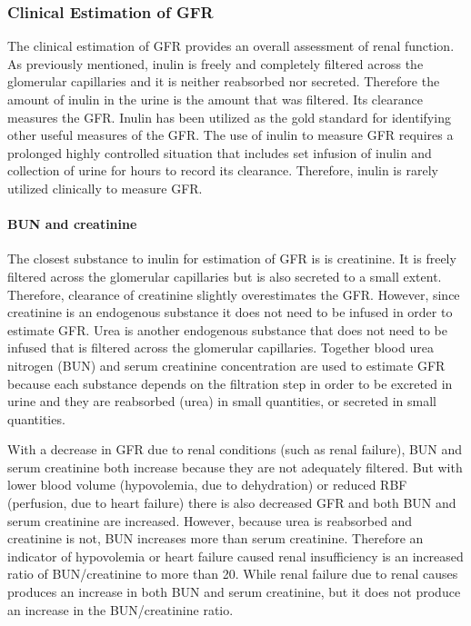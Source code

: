\subsubsection{Clinical Estimation of GFR}

The clinical estimation of GFR provides an overall assessment of renal function. As previously mentioned, inulin is freely and completely filtered across the glomerular capillaries and it is neither reabsorbed nor secreted. Therefore the amount of inulin in the urine is the amount that was filtered. Its clearance measures the GFR. Inulin has been utilized as the gold standard for identifying other useful measures of the GFR. The use of inulin to measure GFR requires a prolonged highly controlled situation that includes set infusion of inulin and collection of urine for hours to record its clearance. Therefore, inulin is rarely utilized clinically to measure GFR.

\paragraph{BUN and creatinine}

The closest substance to inulin for estimation of GFR is is creatinine. It is freely filtered across the glomerular capillaries but is also secreted to a small extent. Therefore, clearance of creatinine slightly overestimates the GFR. However, since creatinine is an endogenous substance it does not need to be infused in order to estimate GFR. Urea is another endogenous substance that does not need to be infused that is filtered across the glomerular capillaries. Together blood urea nitrogen (BUN) and serum creatinine concentration are used to estimate GFR because each substance depends on the filtration step in order to be excreted in urine and they are reabsorbed (urea) in small quantities, or secreted in small quantities. 

With a decrease in GFR due to renal conditions (such as renal failure), BUN and serum creatinine both increase because they are not adequately filtered. But with lower blood volume (hypovolemia, due to dehydration) or reduced RBF (perfusion, due to heart failure) there is also decreased GFR and both BUN and serum creatinine are increased. However, because urea is reabsorbed and creatinine is not, BUN increases more than serum creatinine. Therefore an indicator of hypovolemia or heart failure caused renal insufficiency is an increased ratio of BUN/creatinine to more than 20. While renal failure due to renal causes produces an increase in both BUN and serum creatinine, but it does not produce an increase in the BUN/creatinine ratio.

